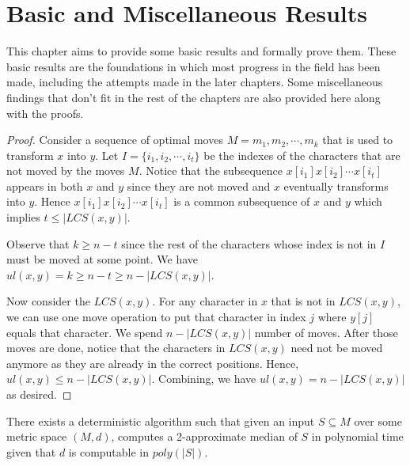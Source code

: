 \chapter{Basic and Miscellaneous Results}

This chapter aims to provide some basic results and formally prove them. These basic results are the foundations in which most progress in the field has been made, including the attempts made in the later chapters. Some miscellaneous findings that don't fit in the rest of the chapters are also provided here along with the proofs.

\begin{theorem}    
\end{theorem}

\begin{proof}
    Consider a sequence of optimal moves $M = m_1, m_2, \cdots, m_k$ that is used to transform $x$ into $y$. Let $I = \{i_1, i_2, \cdots, i_t\}$ be the indexes of the characters that are not moved by the moves $M$. Notice that the subsequence $x[i_1]x[i_2]\cdots x[i_t]$ appears in both $x$ and $y$ since they are not moved and $x$ eventually transforms into $y$. Hence $x[i_1]x[i_2]\cdots x[i_t]$ is a common subsequence of $x$ and $y$ which implies $t \leq |LCS(x, y)|$.

    Observe that $k \geq n - t$ since the rest of the characters whose index is not in $I$ must be moved at some point. We have $ul(x, y) = k \geq n - t \geq n - |LCS(x, y)|$.

    Now consider the $LCS(x, y)$. For any character in $x$ that is not in $LCS(x, y)$, we can use one move operation to put that character in index $j$ where $y[j]$ equals that character. We spend $n - |LCS(x, y)|$ number of moves. After those moves are done, notice that the characters in $LCS(x, y)$ need not be moved anymore as they are already in the correct positions. Hence, $ul(x, y) \leq n - |LCS(x, y)|$. Combining, we have $ul(x, y) = n - |LCS(x, y)|$ as desired.
\end{proof}

\begin{theorem}
\label{FolkloreMedian}
    There exists a deterministic algorithm such that given an input $S \subseteq M$ over some metric space $(M, d)$, computes a 2-approximate median of $S$ in polynomial time given that $d$ is computable in $poly(|S|)$.
\end{theorem}

